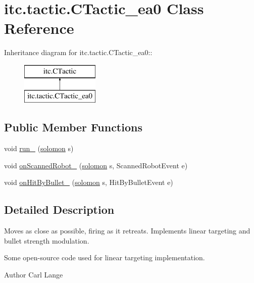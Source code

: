 \hypertarget{classitc_1_1tactic_1_1_c_tactic__ea0}{
\section{itc.tactic.CTactic\_\-ea0 Class Reference}
\label{classitc_1_1tactic_1_1_c_tactic__ea0}
}
Inheritance diagram for itc.tactic.CTactic\_\-ea0::\begin{figure}[H]
\begin{center}
\leavevmode
\includegraphics[height=2cm]{classitc_1_1tactic_1_1_c_tactic__ea0}
\end{center}
\end{figure}
\subsection*{Public Member Functions}
\begin{DoxyCompactItemize}
\item 
void \hyperlink{classitc_1_1tactic_1_1_c_tactic__ea0_af5b367f093ebea65ef06b41b03432289}{run\_\-} (\hyperlink{classitc_1_1solomon}{solomon} s)
\item 
void \hyperlink{classitc_1_1tactic_1_1_c_tactic__ea0_a64e0ac47db137d34d3c52abbde65917f}{onScannedRobot\_\-} (\hyperlink{classitc_1_1solomon}{solomon} s, ScannedRobotEvent e)
\item 
void \hyperlink{classitc_1_1tactic_1_1_c_tactic__ea0_a66859754a34c07f83a114509a86914cb}{onHitByBullet\_\-} (\hyperlink{classitc_1_1solomon}{solomon} s, HitByBulletEvent e)
\end{DoxyCompactItemize}


\subsection{Detailed Description}
Moves as close as possible, firing as it retreats. Implements linear targeting and bullet strength modulation.

Some open-\/source code used for linear targeting implementation.

\begin{DoxyAuthor}{Author}
Carl Lange 
\end{DoxyAuthor}


